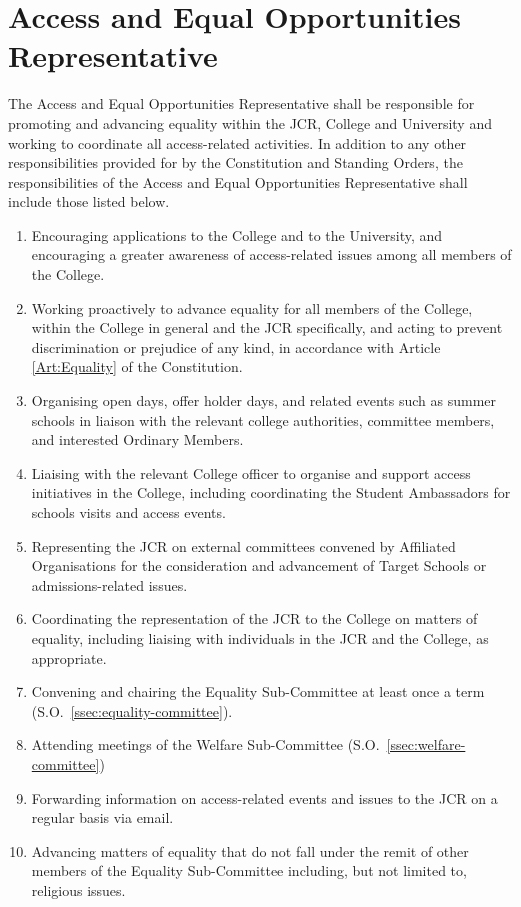 \section{Access and Equal Opportunities Representative}
\npara The Access and Equal Opportunities Representative shall be responsible for promoting and advancing equality within the JCR, College and University and working to coordinate all access-related activities. 
\npara \label{resp:access-rep} In addition to any other responsibilities provided for by the Constitution and Standing Orders, the responsibilities of the Access and Equal Opportunities Representative shall include those listed below.
\begin{enumerate}
	\item Encouraging applications to the College and to the University, and encouraging a greater awareness of access-related issues among all members of the College.     
	\item Working proactively to advance equality for all members of the College, within the College in general and the JCR specifically, and acting to prevent discrimination or prejudice of any kind, in accordance with Article \ref{Art:Equality} of the Constitution. 
	\item Organising open days, offer holder days, and related events such as summer schools in liaison with the relevant college authorities, committee members, and interested Ordinary Members.
	\item Liaising with the relevant College officer to organise and support access initiatives in the College, including coordinating the Student Ambassadors for schools visits and access events.
	\item Representing the JCR on external committees convened by Affiliated Organisations for the consideration and advancement of Target Schools or admissions-related issues.
	\item Coordinating the representation of the JCR to the College on matters of equality, including liaising with individuals in the JCR and the College, as appropriate.
	\item Convening and chairing the Equality Sub-Committee at least once a term (S.O.~\ref{ssec:equality-committee}).
	\item Attending meetings of the Welfare Sub-Committee (S.O.~\ref{ssec:welfare-committee})     
	\item Forwarding information on access-related events and issues to the JCR on a regular basis via email. 
	\item Advancing matters of equality that do not fall under the remit of other members of the Equality Sub-Committee including, but not limited to, religious issues. 

\end{enumerate}

